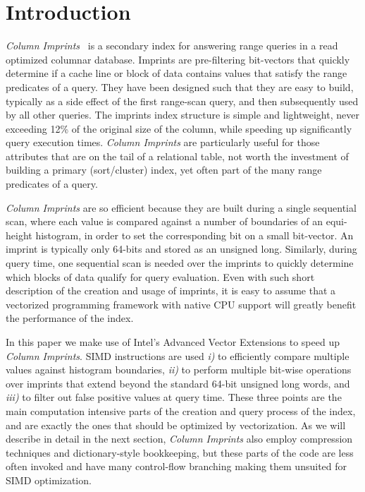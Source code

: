 \documentclass[sigconf]{acmart}
\begin{document}


\maketitle

\section{Introduction}

{\em Column Imprints}~\cite{DBLP:conf/sigmod/SidirourgosK13} is a secondary index
for answering range queries in a read optimized columnar database. Imprints are
pre-filtering bit-vectors that quickly determine if a cache line or block of data
contains values that satisfy the range predicates of a query. They have been designed
such that they are easy to build, typically as a side effect of the first range-scan query,
and then subsequently used by all other queries. The imprints index structure is simple
and lightweight, never exceeding 12\% of the original size of the column, while speeding
up significantly query execution times. {\em Column Imprints} are particularly useful for those
attributes that are on the tail of a relational table, not worth the investment of building
a primary (sort/cluster) index, yet often part of the many range predicates of a query.

{\em Column Imprints} are so efficient because they are built during a single 
sequential scan, where each value is compared against a number of boundaries
of an equi-height histogram, in order to set the corresponding bit on a small bit-vector.
An imprint is typically only 64-bits and stored as an unsigned long. Similarly,
during query time, one sequential scan is needed over the imprints to quickly determine
which blocks of data qualify for query evaluation. Even with such short description of
the creation and usage of imprints, it is easy to assume that a vectorized programming
framework with native CPU support will greatly benefit the performance of the index.

In this paper we make use of Intel's Advanced Vector Extensions 
\cite{IntelManual2011} to speed up {\em Column Imprints}. SIMD instructions are used 
{\em i)} to efficiently compare multiple values against histogram boundaries, {\em ii)} to perform 
multiple bit-wise operations over imprints that extend beyond the
standard 64-bit unsigned long words, and {\em iii)} to filter out false positive 
values at query time. These three points are the main computation intensive parts
of the  creation and query process of the index, and are exactly the ones that should be 
optimized by vectorization. As we will describe in detail in the next section, 
{\em Column Imprints} also employ compression techniques and dictionary-style bookkeeping,
but these parts of the code are less often invoked and have many control-flow branching 
making them unsuited for SIMD optimization.
\end{document}
